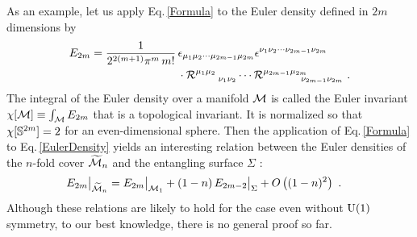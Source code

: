 As an example, let us apply Eq.\,\eqref{Formula} to the Euler density  defined in $2m$ dimensions by
\begin{align}\label{EulerDensity}
\begin{aligned}
	E_{2m} = \frac{1}{2^{2(m+1)}\pi^m\, m!}\, &\epsilon_{\mu_1\mu_2\cdots \mu_{2m-1}\mu_{2m}} \epsilon^{\nu_1\nu_2\cdots \nu_{2m-1}\nu_{2m}}\\
		&\cdot {\cal R}^{\mu_1\mu_2}_{~~~~~~\nu_1\nu_2} \cdots {\cal R}^{\mu_{2m-1}\mu_{2m}}_{~~~~~~~~~~\nu_{2m-1}\nu_{2m}}  \ .
\end{aligned}
\end{align}
The integral of the Euler density over a manifold ${\cal M}$ is called the Euler invariant $\chi[{\cal M}] \equiv \int_{{\cal M}} E_{2m}$ that is a topological invariant.
It is normalized so that $\chi[\mathbb{S}^{2m}] = 2$ for an even-dimensional sphere.
Then the application of Eq.\,\eqref{Formula} to Eq.\,\eqref{EulerDensity} yields an interesting relation between the Euler densities of the $n$-fold cover $\widetilde {{\cal M}}_n$ and the entangling surface $\Sigma$ \cite{Fursaev:1995ef}:
\begin{align}\label{EulerFormula}
	E_{2m}\big|_{\widetilde{{\cal M}}_n} &= E_{2m}\big|_{{\cal M}_1} + (1-n)\, E_{2m-2}\big|_{\Sigma} + O\left((1-n)^2\right)\ .
\end{align}
Although these relations are likely to hold for the case even without $\mathrm{U}(1)$ symmetry, to our best knowledge, there is no general proof so far.




